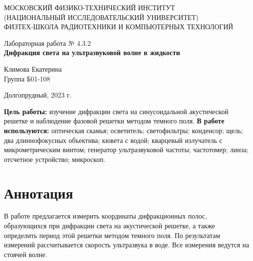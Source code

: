 \documentclass[a4paper,12pt]{article} %
\begin{document}
\begin{center}
	\footnotesize{МОСКОВСКИЙ ФИЗИКО-ТЕХНИЧЕСКИЙ ИНСТИТУТ\\(НАЦИОНАЛЬНЫЙ 			ИССЛЕДОВАТЕЛЬСКИЙ УНИВЕРСИТЕТ)}\\
	\footnotesize{ФИЗТЕХ-ШКОЛА РАДИОТЕХНИКИ И КОМПЬЮТЕРНЫХ ТЕХНОЛОГИЙ\\}
	\hfill \break
	\hfill \break
	\hfill \break
	\hfill \break
	\hfill \break
	\hfill \break
\end{center}

\begin{center}   
    \hfill \break
	\hfill \break
	\hfill \break
	\hfill \break
	\hfill \break
	\hfill \break
	\hfill \break
	\hfill \break
	\hfill \break
	\hfill \break
	\hfill \break
	\large{Лабораторная работа № 4.3.2\\\large{\textbf{Дифракция света на ультразвуковой волне в жидкости}}}\\
	\hfill \break
        \hfill \break
	\hfill \break
	\hfill \break
	\hfill \break
	\hfill \break
	\hfill \break
	\hfill \break
	\hfill \break
	\hfill \break
	\hfill \break
	\begin{flushright}
		Климова Екатерина\\
		Группа Б01-108
	\end{flushright}
	\hfill \break
\end{center}
\hfill \break
\hfill \break
\begin{center}
	Долгопрудный, 2023 г.
\end{center}
\thispagestyle{empty}

\newpage
\hfill \break
\textbf{Цель работы:} изучение дифракции света на синусоидальной акустической решетке и наблюдение фазовой решетки методом темного поля.
\hfill \break
\hfill \break
\textbf{В работе используются:} оптическая скамья; осветитель; светофильтры; конденсор; щель; два длиннофокусных объектива; кювета с водой; кварцевый излучатель с микрометрическим винтом; генератор ультразвуковой частоты; частотомер; линза; отсчетное устройство; микроскоп.

\section{Аннотация}
\hfill \break В работе предлагается измерить координаты дифракционных полос, образующихся при дифракции света на акустической решетке, а также определить период этой решетки методом темного поля. По результатам измерений рассчитывается скорость ультразвука в воде. Все измерения ведутся на стоячей волне.
\end{document}
